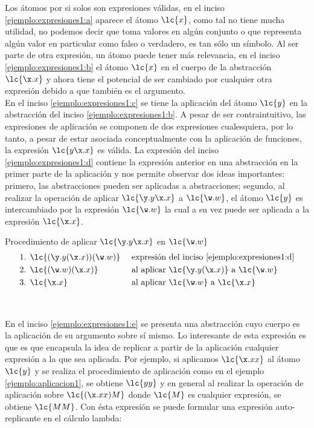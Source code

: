 Los átomos por si solos son expresiones válidas, en el inciso
\eqref{ejemplo:expresiones1:a} aparece el átomo \(\lc{x}\), como tal no tiene
mucha utilidad, no podemos decir que toma valores en algún conjunto o que
representa algún valor en particular como falso o verdadero, es tan sólo un
símbolo. Al ser parte de otra expresión, un átomo puede tener más relevancia, en
el inciso \eqref{ejemplo:expresiones1:b} el átomo \(\lc{x}\) en el cuerpo de la
abstracción \(\lc{\x.x}\) y ahora tiene el potencial de ser cambiado por
cualquier otra expresión debido a que también es el argumento. \\

En el inciso \eqref{ejemplo:expresiones1:c} se tiene la aplicación del átomo
\(\lc{y}\) en la abstracción del inciso \eqref{ejemplo:expresiones1:b}. A pesar de
ser contraintuitivo, las expresiones de aplicación se componen de dos
expresiones cualesquiera, por lo tanto, a pesar de estar asociada
conceptualmente con la aplicación de funciones, la expresión \(\lc{y\x.x}\) es
válida. La expresión del inciso \eqref{ejemplo:expresiones1:d} contiene la
expresión anterior en una abstracción en la primer parte de la aplicación y nos
permite observar dos ideas importantes: primero, las abstracciones pueden ser
aplicadas a abstracciones; segundo, al realizar la operación de aplicar
\(\lc{\y.y\x.x}\) a \(\lc{\w.w}\), el átomo \(\lc{y}\) es intercambiado por la
expresión \(\lc{\w.w}\) la cual a su vez puede ser aplicada a la expresión
\(\lc{\x.x}\). \\

\begin{ejemplo} Procedimiento de aplicar \(\lc{\y.y\x.x}\) en \(\lc{\w.w}\) \label{ejemplo:aplicacion1}
  \begin{align*}
    \text{1. } &\lc{(\y.y(\x.x))(\w.w)} & &\text{ expresión del inciso \eqref{ejemplo:expresiones1:d}}\\ 
    \text{2. } &\lc{(\w.w)(\x.x)} & &\text{ al aplicar } \lc{\y.y(\x.x)} \text{ a } \lc{\w.w}\\ 
    \text{3. } &\lc{\x.x} & &\text{ al aplicar } \lc{\w.w} \text{ a } \lc{\x.x}
  \end{align*}
\end{ejemplo} \

En el inciso \eqref{ejemplo:expresiones1:e} se presenta una abstracción cuyo
cuerpo es la aplicación de su argumento sobre sí mismo. Lo interesante de esta
expresión es que es que encapsula la idea de replicar a partir de la aplicación
cualquier expresión a la que sea aplicada. Por ejemplo, si aplicamos \(\lc{\x.x
  x}\) al átomo \(\lc{y}\) y se realiza el procedimiento de aplicación como en
el ejemplo \ref{ejemplo:aplicacion1}, se obtiene \(\lc{y y}\) y en general al
realizar la operación de aplicación sobre \(\lc{(\x.x x)M}\) donde \(\lc{M}\) es
cualquier expresión, se obtiene \(\lc{M M}\). Con ésta expresión se puede
formular una expresión auto-replicante en el cálculo lambda: \\

